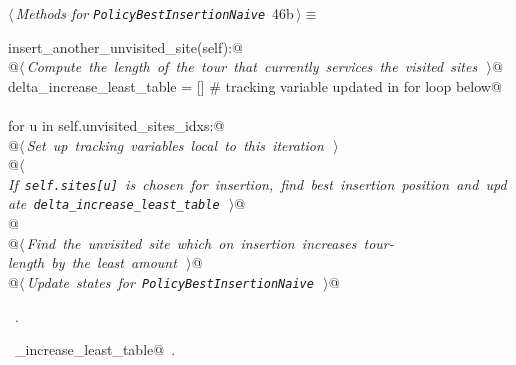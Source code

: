 \documentclass[11.5pt]{report}
\begin{document}
\vspace{-0.8cm}\newchunk 
\begin{flushleft} \small\label{scrap67}\raggedright\small
{} $\langle\,${\itshape Methods for \verb|PolicyBestInsertionNaive|}\nobreak\ {\footnotesize {46b}}$\,\rangle\equiv$
\vspace{-1ex}
\begin{list}{}{} \item
\mbox{}\verb@def insert_another_unvisited_site(self):@\\
\mbox{}\verb@   @\hbox{$\langle\,${\itshape Compute the length of the tour that currently services the visited sites}\nobreak\ {\footnotesize {}}$\,\rangle$}\verb@    @\\
\mbox{}\verb@   delta_increase_least_table = [] # tracking variable updated in for loop below@\\
\mbox{}\verb@@\\
\mbox{}\verb@   for u in self.unvisited_sites_idxs:@\\
\mbox{}\verb@      @\hbox{$\langle\,${\itshape Set up tracking variables local to this iteration}\nobreak\ {\footnotesize {}}$\,\rangle$}\verb@@\\
\mbox{}\verb@      @\hbox{$\langle\,${\itshape If \texttt{self.sites[u]} is chosen for insertion, find best insertion position and update \texttt{delta\_increase\_least\_table}}\nobreak\ {\footnotesize {}}$\,\rangle$}\verb@  @\\
\mbox{}\verb@                 @\\
\mbox{}\verb@   @\hbox{$\langle\,${\itshape Find the unvisited site which on insertion increases tour-length by the least amount}\nobreak\ {\footnotesize {}}$\,\rangle$}\verb@     @\\
\mbox{}\verb@   @\hbox{$\langle\,${\itshape Update states for \texttt{PolicyBestInsertionNaive}}\nobreak\ {\footnotesize {}}$\,\rangle$}\verb@ @\\
\mbox{}\verb@@{\NWsep}
\end{list}
\vspace{-1.5ex}
\footnotesize
\begin{list}{}{\setlength{\itemsep}{-\parsep}\setlength{\itemindent}{-\leftmargin}}
\item \NWtxtMacroRefIn\ .
\item \NWtxtIdentsDefed\nobreak\  \verb@delta_increase_least_table@\nobreak\ .
\item{}
\end{list}
\vspace{4ex}
\end{flushleft}
\end{document}
